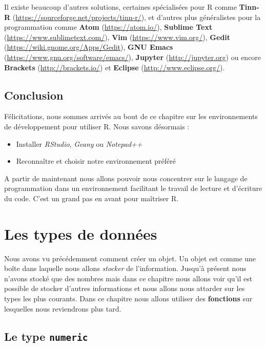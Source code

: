 \documentclass[twoside,symmetric]{book}
\providecommand{\tightlist}{%
  \setlength{\itemsep}{0pt}\setlength{\parskip}{0pt}}
\begin{document}
Il existe beaucoup d'autres solutions, certaines spécialisées pour R comme \textbf{Tinn-R} (\url{https://sourceforge.net/projects/tinn-r/}), et d'autres plus généralistes pour la programmation comme \textbf{Atom} (\url{https://atom.io/}), \textbf{Sublime Text} (\url{https://www.sublimetext.com/}), \textbf{Vim} (\url{https://www.vim.org/}), \textbf{Gedit} (\url{https://wiki.gnome.org/Apps/Gedit}), \textbf{GNU Emacs} (\url{https://www.gnu.org/software/emacs/}), \textbf{Jupyter} (\url{http://jupyter.org}) ou encore \textbf{Brackets} (\url{http://brackets.io/}) et \textbf{Eclipse} (\url{http://www.eclipse.org/}).

\hypertarget{conclusion-1}{%
\section{Conclusion}\label{conclusion-1}}

Félicitations, nous sommes arrivés au bout de ce chapitre sur les environnements de développement pour utiliser R. Nous savons désormais :

\begin{itemize}
\tightlist
\item
  Installer \emph{RStudio}, \emph{Geany} ou \emph{Notepad++}
\item
  Reconnaître et choisir notre environnement préféré
\end{itemize}

A partir de maintenant nous allons pouvoir nous concentrer sur le langage de programmation dans un environnement facilitant le travail de lecture et d'écriture du code. C'est un grand pas en avant pour maîtriser R.

\hypertarget{dataType1}{%
\chapter{Les types de données}\label{dataType1}}

\minitoc

Nous avons vu précédemment comment créer un objet. Un objet est comme une boîte dans laquelle nous allons \emph{stocker} de l'information. Jusqu'à présent nous n'avons stocké que des nombres mais dans ce chapitre nous allons voir qu'il est possible de stocker d'autres informations et nous allons nous attarder sur les types les plus courants. Dans ce chapitre nous allons utiliser des \textbf{fonctions} sur lesquelles nous reviendrons plus tard.

\hypertarget{le-type-numeric}{%
\section{\texorpdfstring{Le type \texttt{numeric}}{Le type numeric}}\label{le-type-numeric}}
\end{document}
